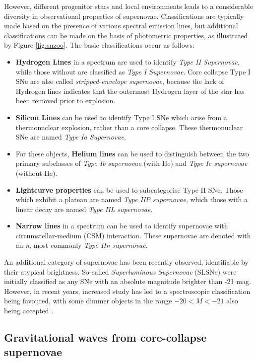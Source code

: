 However, different progenitor stars and local environments leads to a considerable diversity in observational properties of supernovae. Classifications are typically made based on the presence of various spectral emission lines, but additional classifications can be made on the basis of photometric properties, as illustrated by Figure \ref{fig:snzoo}. The basic classifications occur as follows:

\begin{itemize}
	\item \textbf{Hydrogen Lines} in a spectrum are used to identify \emph{Type II Supernovae}, while those without are classified as \emph{Type I Supernovae}. Core collapse Type I SNe are also called \emph{stripped-envelope supernovae}, because the lack of Hydrogen lines indicates that the outermost Hydrogen layer of the star has been removed prior to explosion. 
	\item \textbf{Silicon Lines} can be used to identify Type I SNe which arise from a thermonuclear explosion, rather than a core collapse. These thermonuclear SNe are named \emph{Type Ia Supernovae}.
	\item For these objects, \textbf{Helium lines} can be used to distinguish between the two primary subclasses of \emph{Type Ib supernovae} (with He) and \emph{Type Ic supernovae} (without He).
	\item \textbf{Lightcurve properties} can be used to subcategorise Type II SNe. Those which exhibit a plateau are named \emph{Type IIP supernovae}, which those with a linear decay are named \emph{Type IIL supernovae}.
	\item \textbf{Narrow lines} in a spectrum can be used to identify supernovae with circumstellar-medium (CSM) interaction. These supernovae are denoted with an \emph{n}, most commonly \emph{Type IIn supernovae}.
\end{itemize}

An additional category of supernovae has been recently observed, identifiable by their atypical brightness. So-called \emph{Superluminous Supernovae} (SLSNe) were initially classified as any SNe with an absolute magnitude brighter than -21 mag. However, in recent years, increased study has led to a spectroscopic classification being favoured, with some dimmer objects in the range $-20 < M < -21$ also being accepted . 

\subsection*{Gravitational waves from core-collapse supernovae}

